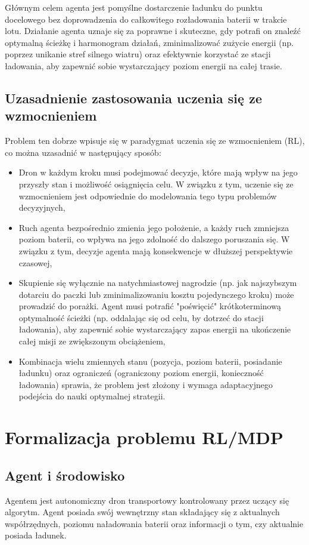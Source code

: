 \documentclass[12pt]{article}
\begin{document}
Głównym celem agenta jest pomyślne dostarczenie ładunku do punktu docelowego bez doprowadzenia do całkowitego rozładowania baterii w trakcie lotu. Działanie agenta uznaje się za poprawne i skuteczne, gdy potrafi on znaleźć optymalną ścieżkę i harmonogram działań, zminimalizować zużycie energii (np. poprzez unikanie stref silnego wiatru) oraz efektywnie korzystać ze stacji ładowania, aby zapewnić sobie wystarczający poziom energii na całej trasie.

\subsection{Uzasadnienie zastosowania uczenia się ze wzmocnieniem}
Problem ten dobrze wpisuje się w paradygmat uczenia się ze wzmocnieniem (RL), co można uzasadnić w następujący sposób:

\begin{itemize}
    \item Dron w każdym kroku musi podejmować decyzje, które mają wpływ na jego przyszły stan i możliwość osiągnięcia celu. W związku z tym, uczenie się ze wzmocnieniem jest odpowiednie do modelowania tego typu problemów decyzyjnych,
    \item Ruch agenta bezpośrednio zmienia jego położenie, a każdy ruch
    zmniejsza poziom baterii, co wpływa na jego zdolność do dalszego poruszania się. W związku z tym, decyzje agenta mają konsekwencje w dłuższej perspektywie czasowej,
    \item Skupienie się wyłącznie na natychmiastowej nagrodzie (np. jak najszybszym dotarciu do paczki lub zminimalizowaniu kosztu pojedynczego kroku) może prowadzić do porażki. Agent musi potrafić "poświęcić" krótkoterminową optymalność ścieżki (np. oddalając się od celu, by dotrzeć do stacji ładowania), aby zapewnić sobie wystarczający zapas energii na ukończenie całej misji ze zwiększonym obciążeniem,
    \item Kombinacja wielu zmiennych stanu (pozycja, poziom baterii,
    posiadanie ładunku) oraz ograniczeń (ograniczony poziom energii, konieczność ładowania) sprawia, że problem jest złożony i wymaga adaptacyjnego podejścia do nauki optymalnej strategii.
\end{itemize}

\section{Formalizacja problemu RL/MDP}

\subsection{Agent i środowisko}
Agentem jest autonomiczny dron transportowy kontrolowany przez uczący się algorytm. Agent posiada swój wewnętrzny stan składający się z aktualnych współrzędnych, poziomu naładowania baterii oraz informacji o tym, czy aktualnie posiada ładunek.
\end{document}
